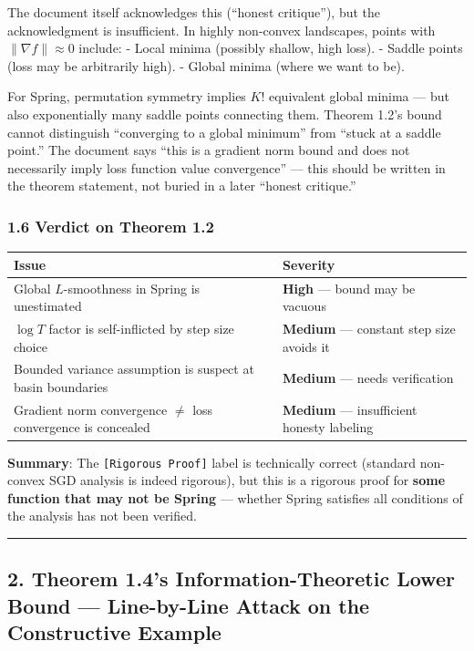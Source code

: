\documentclass[
  12pt,
]{article}
\begin{document}
The document itself acknowledges this (``honest critique''), but the acknowledgment is insufficient. In highly non-convex landscapes, points with $\|\nabla f\| \approx 0$ include:
- Local minima (possibly shallow, high loss).
- Saddle points (loss may be arbitrarily high).
- Global minima (where we want to be).

For Spring, permutation symmetry implies $K!$ equivalent global minima --- but also exponentially many saddle points connecting them. Theorem 1.2's bound cannot distinguish ``converging to a global minimum'' from ``stuck at a saddle point.'' The document says ``this is a gradient norm bound and does not necessarily imply loss function value convergence'' --- this should be written in the theorem statement, not buried in a later ``honest critique.''

\subsubsection{1.6 Verdict on Theorem 1.2}\label{verdict-thm-1.2}

\begin{longtable}[]{@{}ll@{}}
\toprule\noalign{}
Issue & Severity \\
\midrule\noalign{}
\endhead
\bottomrule\noalign{}
\endlastfoot
Global $L$-smoothness in Spring is unestimated & \textbf{High} --- bound may be vacuous \\
$\log T$ factor is self-inflicted by step size choice & \textbf{Medium} --- constant step size avoids it \\
Bounded variance assumption is suspect at basin boundaries & \textbf{Medium} --- needs verification \\
Gradient norm convergence $\neq$ loss convergence is concealed & \textbf{Medium} --- insufficient honesty labeling \\
\end{longtable}

\textbf{Summary}: The \texttt{[Rigorous Proof]} label is technically correct (standard non-convex SGD analysis is indeed rigorous), but this is a rigorous proof for \textbf{some function that may not be Spring} --- whether Spring satisfies all conditions of the analysis has not been verified.

\begin{center}\rule{0.5\linewidth}{0.5pt}\end{center}

\subsection{2. Theorem 1.4's Information-Theoretic Lower Bound --- Line-by-Line Attack on the Constructive Example}\label{attack-thm-1.4}
\end{document}

